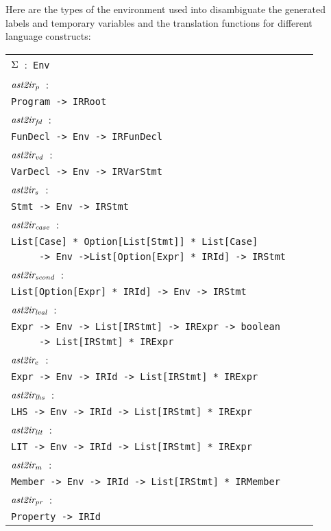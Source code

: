 Here are the types of the environment used into disambiguate the generated labels and
temporary variables and the translation functions for different language constructs:

\medskip
\small
\begin{tabular}{lll}
$\Sigma$\ :\  \verb+Env+\\
$\emph{ast2ir}_p$\ :\\
\verb+Program -> IRRoot+\\
$\emph{ast2ir}_{\emph{fd}}$\ :\\
\verb+FunDecl -> Env -> IRFunDecl+\\
$\emph{ast2ir}_{\emph{vd}}$\ :\\
\verb+VarDecl -> Env -> IRVarStmt+\\
$\emph{ast2ir}_s$\ :\\
\verb+Stmt -> Env -> IRStmt+\\
$\emph{ast2ir}_\emph{case}$\ :\\
\verb!List[Case] * Option[List[Stmt]] * List[Case]!\\
\verb+     -> Env ->List[Option[Expr] * IRId] -> IRStmt+\\
$\emph{ast2ir}_\emph{scond}$\ :\\
 \verb+List[Option[Expr] * IRId] -> Env -> IRStmt+\\
$\emph{ast2ir}_{\emph{lval}}$\ :\\
\verb+Expr -> Env -> List[IRStmt] -> IRExpr -> boolean+\\
\verb+     -> List[IRStmt] * IRExpr+\\
$\emph{ast2ir}_e$\ :\\
\verb+Expr -> Env -> IRId -> List[IRStmt] * IRExpr+\\
$\emph{ast2ir}_{\emph{lhs}}$\ :\\
\verb+LHS -> Env -> IRId -> List[IRStmt] * IRExpr+\\
$\emph{ast2ir}_{\emph{lit}}$\ :\\
\verb+LIT -> Env -> IRId -> List[IRStmt] * IRExpr+\\
$\emph{ast2ir}_m$\ :\\
\verb+Member -> Env -> IRId -> List[IRStmt] * IRMember+\\
$\emph{ast2ir}_{\emph{pr}}$\ :\\
\verb+Property -> IRId+
\end{tabular}

